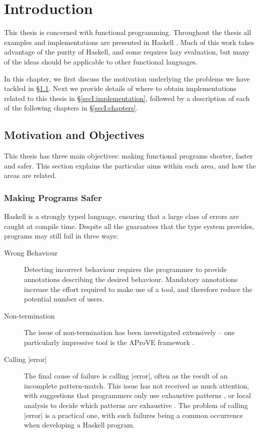 
\chapter{Introduction}
\label{chp:introduction}

This thesis is concerned with functional programming. Throughout the thesis all examples and implementations are presented in Haskell \cite{haskell}. Much of this work takes advantage of the purity of Haskell, and some requires lazy evaluation, but many of the ideas should be applicable to other functional languages.

In this chapter, we first discuss the motivation underlying the problems we have tackled in \S\ref{secI:motivation}. Next we provide details of where to obtain implementations related to this thesis in \S\ref{secI:implementation}, followed by a description of each of the following chapters in \S\ref{secI:chapters}.


\section{Motivation and Objectives}
\label{secI:motivation}

This thesis has three main objectives: making functional programs shorter, faster and safer. This section explains the particular aims within each area, and how the areas are related.

\subsection{Making Programs Safer}

Haskell is a strongly typed language, ensuring that a large class of errors are caught at compile time. Despite all the guarantees that the type system provides, programs may still fail in three ways:

\begin{description}
\item[Wrong Behaviour] Detecting incorrect behaviour requires the programmer to provide annotations describing the desired behaviour. Mandatory annotations increase the effort required to make use of a tool, and therefore reduce the potential number of users.
\item[Non-termination] The issue of non-termination has been investigated extensively -- one particularly impressive tool is the AProVE framework \cite{aprove_haskell}.
\item[Calling |error|] The final cause of failure is calling |error|, often as the result of an incomplete pattern-match. This issue has not received as much attention, with suggestions that programmers only use exhaustive patterns \cite{turner:total}, or local analysis to decide which patterns are exhaustive \cite{maranget:pattern_warnings}. The problem of calling |error| is a practical one, with such failures being a common occurrence when developing a Haskell program.
\end{description}

